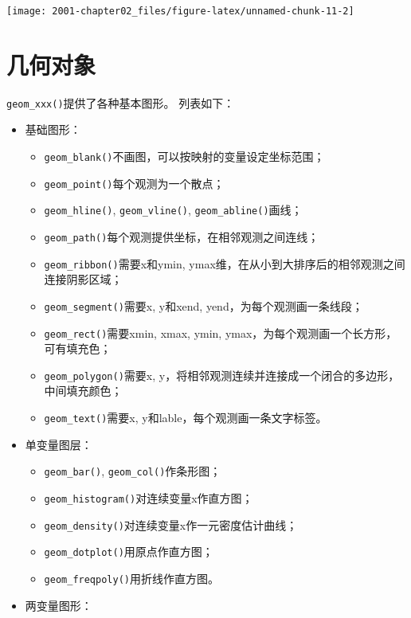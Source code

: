 \documentclass[
]{book}
\providecommand{\tightlist}{%
  \setlength{\itemsep}{0pt}\setlength{\parskip}{0pt}}
\begin{document}
\begin{center}\texttt{[image: 2001-chapter02\_files/figure-latex/unnamed-chunk-11-2]} \end{center}

\hypertarget{ux51e0ux4f55ux5bf9ux8c61}{%
\section{几何对象}\label{ux51e0ux4f55ux5bf9ux8c61}}

\texttt{geom\_xxx()}提供了各种基本图形。 列表如下：

\begin{itemize}
\item
  基础图形：

  \begin{itemize}
  \tightlist
  \item
    \texttt{geom\_blank()}不画图，可以按映射的变量设定坐标范围；
  \item
    \texttt{geom\_point()}每个观测为一个散点；
  \item
    \texttt{geom\_hline()}, \texttt{geom\_vline()}, \texttt{geom\_abline()}画线；
  \item
    \texttt{geom\_path()}每个观测提供坐标，在相邻观测之间连线；
  \item
    \texttt{geom\_ribbon()}需要x和ymin,
    ymax维，在从小到大排序后的相邻观测之间连接阴影区域；
  \item
    \texttt{geom\_segment()}需要x, y和xend, yend，为每个观测画一条线段；
  \item
    \texttt{geom\_rect()}需要xmin, xmax, ymin,
    ymax，为每个观测画一个长方形，可有填充色；
  \item
    \texttt{geom\_polygon()}需要x,
    y，将相邻观测连续并连接成一个闭合的多边形，中间填充颜色；
  \item
    \texttt{geom\_text()}需要x, y和lable，每个观测画一条文字标签。
  \end{itemize}
\item
  单变量图层：

  \begin{itemize}
  \tightlist
  \item
    \texttt{geom\_bar()}, \texttt{geom\_col()}作条形图；
  \item
    \texttt{geom\_histogram()}对连续变量x作直方图；
  \item
    \texttt{geom\_density()}对连续变量x作一元密度估计曲线；
  \item
    \texttt{geom\_dotplot()}用原点作直方图；
  \item
    \texttt{geom\_freqpoly()}用折线作直方图。
  \end{itemize}
\item
  两变量图形：


\end{itemize}
\end{document}
